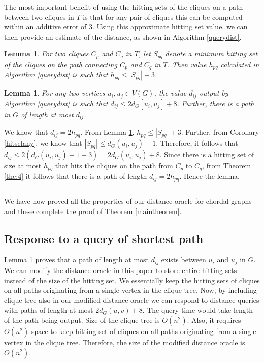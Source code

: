 \documentclass[MS,synopsis]{iitmdiss}
\newtheorem{lemma}[theorem]{Lemma}
\newcommand{\qed}{\rule{7pt}{7pt}}
\newenvironment{proof}{\noindent{\bf Proof}\hspace*{1em}}{\hfill\qed\bigskip}
\begin{document}
 The most important benefit of using the hitting sets of the cliques on a path between two cliques in $T$
 is that for any pair of cliques this can be computed within an additive error of 3. 
 Using this approximate hitting set value, we can then provide an estimate of the distance, as shown in Algorithm \ref{querydist}.   
  
 \begin{lemma}\label{lam:ab}
  For two cliques $C_p$ and $C_q$ in $T$, let $S_{pq}$ denote a minimum hitting set of the cliques on the path connecting $C_p$ and $C_q$ in $T$. 
  Then value $h_{pq}$ calculated in Algorithm \ref{querydist} is such that $h_{pq} \leq |S_{pq}|+3$.
 \end{lemma}
  
 \begin{lemma}\label{distlemm}
 For any two vertices $u_i, u_j \in V(G)$, the value $d_{ij}$ output by Algorithm \ref{querydist} is such that  $d_{ij} \leq 2d_G[u_i,u_j]+8$.
 Further, there is a path in $G$ of length at most $d_{ij}$.
 \end{lemma}
 \begin{proof}
 We know that $d_{ij} = 2h_{pq}$. From Lemma \ref{lam:ab}, $h_{pq} \leq |S_{pq}|+3$. 
 Further, from Corollary \ref{hitselany}, we know that $|S_{pq}| \leq d_G(u_i,u_j) + 1$.  
 Therefore, it follows that $d_{ij} \leq 2(d_G(u_i,u_j)+1+ 3)=2d_G(u_i,u_j)+8$.  
 Since there is a hitting set of size at most $h_{pq}$ that hits the cliques on the path from $C_p$ to $C_q$, 
 from Theorem \ref{the:4} it follows that there is a path of length $d_{ij}=2h_{pq}$. Hence the lemma.
 \end{proof}
 
 We have now proved all the properties of our distance oracle for chordal graphs and these complete the proof of  Theorem \ref{maintheorem}.
 
 \subsection{Response to a query of shortest path}
 Lemma \ref{distlemm} proves that a path of length at most $d_{ij}$ exists between $u_i$ and $u_j$ in $G$. 
 We can modify the distance oracle in this paper to store entire hitting sets instead of the size of the hitting set.
 We essentially keep the hitting sets of cliques on all paths originating from a 
single vertex in the clique tree.
 Now, by including clique tree also in our modified distance oracle we can respond to distance queries with paths of length at most $2d_G(u,v)+8$.
 The query time would take length of the path being output.
 Size of the clique tree is $O(n^2)$. Also, it requires $O(n^2)$ space to keep hitting set of cliques on all paths originating from a 
single vertex in the clique tree. Therefore, the size of the modified distance oracle is $O(n^2)$.
\end{document}
